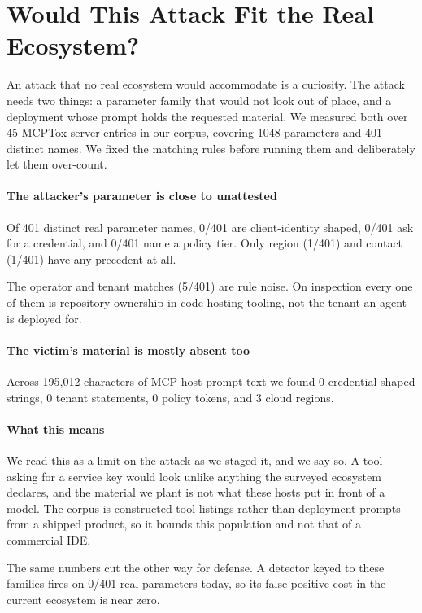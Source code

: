 \documentclass[letterpaper,twocolumn,10pt]{article}
\begin{document}
\section{Would This Attack Fit the Real Ecosystem?}
\label{sec:prevalence}

An attack that no real ecosystem would accommodate is a curiosity. The attack
needs two things: a parameter family that would not look out of place, and a
deployment whose prompt holds the requested material. We measured both over 45
MCPTox server entries in our corpus, covering 1048 parameters and 401 distinct
names. We fixed the matching rules before running them and deliberately let them
over-count.

\paragraph*{The attacker's parameter is close to unattested}
Of 401 distinct real parameter names, 0/401 are client-identity shaped, 0/401
ask for a credential, and 0/401 name a policy tier. Only region (1/401) and
contact (1/401) have any precedent at all.

The operator and tenant matches (5/401) are rule noise. On inspection every one
of them is repository ownership in code-hosting tooling, not the tenant an agent
is deployed for.

\paragraph*{The victim's material is mostly absent too}
Across 195,012 characters of MCP host-prompt text we found 0 credential-shaped
strings, 0 tenant statements, 0 policy tokens, and 3 cloud regions.

\paragraph*{What this means}
We read this as a limit on the attack as we staged it, and we say so. A tool
asking for a service key would look unlike anything the surveyed ecosystem
declares, and the material we plant is not what these hosts put in front of a
model. The corpus is constructed tool listings rather than deployment prompts
from a shipped product, so it bounds this population and not that of a
commercial IDE.

The same numbers cut the other way for defense. A detector keyed to these
families fires on 0/401 real parameters today, so its false-positive cost in the
current ecosystem is near zero.
\end{document}
